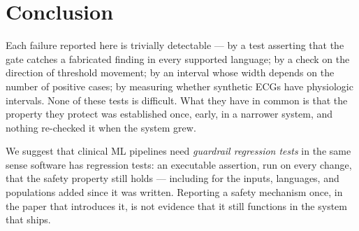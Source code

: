 \documentclass[pmlr,twocolumn,10pt]{jmlr}
\begin{document}
\section{Conclusion}

Each failure reported here is trivially detectable --- by a test asserting that the gate
catches a fabricated finding in every supported language; by a check on the direction of
threshold movement; by an interval whose width depends on the number of positive cases; by
measuring whether synthetic ECGs have physiologic intervals. None of these tests is
difficult. What they have in common is that the property they protect was established once,
early, in a narrower system, and nothing re-checked it when the system grew.

We suggest that clinical ML pipelines need \emph{guardrail regression tests} in the same
sense software has regression tests: an executable assertion, run on every change, that the
safety property still holds --- including for the inputs, languages, and populations added
since it was written. Reporting a safety mechanism once, in the paper that introduces it, is
not evidence that it still functions in the system that ships.


\end{document}
